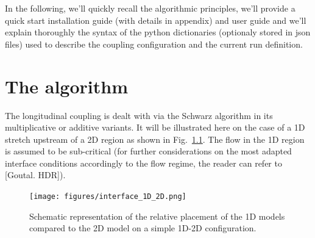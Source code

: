 \documentclass[Coupling]{../../data/TelemacDoc} %
\begin{document}
In the following, we'll quickly recall the algorithmic principles,
we'll provide a quick start installation guide (with details in
appendix) and user guide and we'll explain thoroughly the syntax of
the python dictionaries (optionaly stored in json files) used to
describe the coupling configuration and the 
current run definition.

\chapter{The algorithm}\label{algo}

The longitudinal coupling is dealt with via the Schwarz 
algorithm in its multiplicative or additive variants. It will be
illustrated here on the case of a 1D stretch 
upstream of a 2D region as shown in
Fig.~\ref{fig:interface_1D_2D}. The flow in the 1D region is assumed
to be sub-critical (for further considerations on the most adapted
interface 
conditions accordingly to the flow regime, the reader can refer to
[Goutal. HDR]).
\begin{figure}[htbp]
    \centering
    \texttt{[image: figures/interface\_1D\_2D.png]}
    \caption{Schematic representation of the relative placement of the
      1D models compared to the 2D model on a simple 1D-2D
      configuration.}\label{fig:interface_1D_2D} 
\end{figure}
\end{document}
